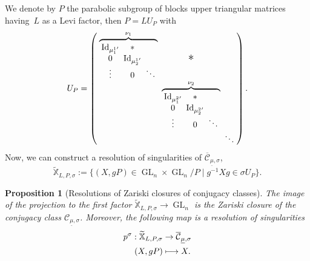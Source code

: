 \documentclass[JEP,XML,SOM,NoEqCountersInSection,Unicode,published]{cedram}
\newcommand\mto{\mathchoice{\longmapsto}{\mapsto}{\mapsto}{\mapsto}}
\theoremstyle{definition}
\theoremstyle{plain}
\newtheorem{proposition}[definition]{Proposition}
\DeclareMathOperator{\Id}{Id}
\DeclareMathOperator{\GL}{GL}
\newcommand{\map}[5]{%
\begin{split}
#1: #2 & \to #3 \\
#4 & \mto #5
\end{split}%
}
\newcommand{\inv}{^{-1}}
\begin{document}
We denote by $P$ the parabolic subgroup of blocks upper triangular matrices having~$L$ as a Levi factor, then $P=L U_P$ with
\[\arraycolsep2.5pt
U_P =\left(
\begin{array}{ccccc}
\overbrace{
\begin{array}{ccccc}
\Id_{{\mu^{1}_1}' } & * & \\
0 & \Id_{{\mu^{1}_2}' } & \\
\vdots & 0 & \ddots
\end{array}
}^{\nu_1} & \text{\Large{*}} & \\
& \overbrace{
\begin{array}{ccccc}
\Id_{{\mu^{2}_1}' } & * & \\
0 & \Id_{{\mu^{2}_2}' } & \\
\vdots & 0 & \ddots
\end{array}
}^{\nu_2} & \\
& & \ddots
\end{array}
\right).
\]
Now, we can construct a resolution of singularities of $\overline{\mathcal{C}}_{\underline{\mu},\sigma}$,
\[
\mathbb{\widetilde{X}}_{L,P,\sigma} :=\lbrace (X, g P) \in \GL_n \times \GL_n / P \mid g\inv X g \in \sigma U_P\rbrace.
\]
\begin{proposition}[Resolutions of Zariski closures of conjugacy classes]\label{prop_resol_closure}
The image of the projection to the first factor $\mathbb{\widetilde{X}}_{L,P,\sigma}\to \GL_n $ is the Zariski closure of the conjugacy class $\mathcal{C}_{\underline{\mu},\sigma}$. Moreover, the following map is a resolution of singularities
\[
\map{p^{\sigma}}{\mathbb{\widetilde{X}}_{L,P,\sigma}}{\overline{\mathcal{C}}_{\underline{\mu},\sigma}}{(X,g P)}{X.}
\]
\end{proposition}

\label{sect_resol_cc}
\end{document}
